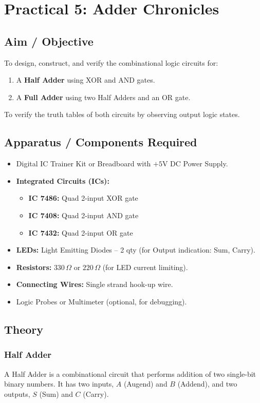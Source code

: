 \chapter{Practical 5: Adder Chronicles}

\section{Aim / Objective}
To design, construct, and verify the combinational logic circuits for:
\begin{enumerate}
    \item A \textbf{Half Adder} using XOR and AND gates.
    \item A \textbf{Full Adder} using two Half Adders and an OR gate.
\end{enumerate}
To verify the truth tables of both circuits by observing output logic states.

\section{Apparatus / Components Required}
\begin{itemize}
    \item Digital IC Trainer Kit or Breadboard with $+5\text{V DC}$ Power Supply.
    \item \textbf{Integrated Circuits (ICs):}
    \begin{itemize}
        \item \textbf{IC 7486:} Quad 2-input XOR gate
        \item \textbf{IC 7408:} Quad 2-input AND gate
        \item \textbf{IC 7432:} Quad 2-input OR gate
    \end{itemize}
    \item \textbf{LEDs:} Light Emitting Diodes -- 2 qty (for Output indication: Sum, Carry).
    \item \textbf{Resistors:} $330\,\Omega$ or $220\,\Omega$ (for LED current limiting).
    \item \textbf{Connecting Wires:} Single strand hook-up wire.
    \item Logic Probes or Multimeter (optional, for debugging).
\end{itemize}

\section{Theory}

\subsection{Half Adder}
A Half Adder is a combinational circuit that performs addition of two single-bit binary numbers. It has two inputs, $A$ (Augend) and $B$ (Addend), and two outputs, $S$ (Sum) and $C$ (Carry).

